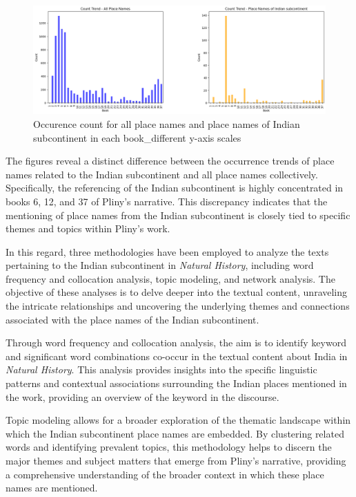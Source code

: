 \documentclass[
  12pt,
]{article}
\begin{document}
\begin{figure}

{\centering \includegraphics{NHthesis_structure_files/figure-pdf/fig-subplots_place_name_count_comparison-output-1.png}

}

\caption{\label{fig-subplots_place_name_count_comparison}Occurence count
for all place names and place names of Indian subcontinent in each
book\_different y-axis scales}

\end{figure}

The figures reveal a distinct difference between the occurrence trends
of place names related to the Indian subcontinent and all place names
collectively. Specifically, the referencing of the Indian subcontinent
is highly concentrated in books 6, 12, and 37 of Pliny's narrative. This
discrepancy indicates that the mentioning of place names from the Indian
subcontinent is closely tied to specific themes and topics within
Pliny's work.

In this regard, three methodologies have been employed to analyze the
texts pertaining to the Indian subcontinent in \emph{Natural History},
including word frequency and collocation analysis, topic modeling, and
network analysis. The objective of these analyses is to delve deeper
into the textual content, unraveling the intricate relationships and
uncovering the underlying themes and connections associated with the
place names of the Indian subcontinent.

Through word frequency and collocation analysis, the aim is to identify
keyword and significant word combinations co-occur in the textual
content about India in \emph{Natural History}. This analysis provides
insights into the specific linguistic patterns and contextual
associations surrounding the Indian places mentioned in the work,
providing an overview of the keyword in the discourse.

Topic modeling allows for a broader exploration of the thematic
landscape within which the Indian subcontinent place names are embedded.
By clustering related words and identifying prevalent topics, this
methodology helps to discern the major themes and subject matters that
emerge from Pliny's narrative, providing a comprehensive understanding
of the broader context in which these place names are mentioned.
\end{document}
